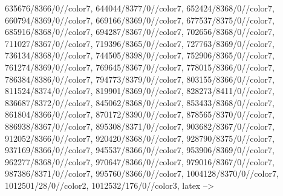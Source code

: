 {635676/8366/0//color7,
644044/8377/0//color7,
652424/8368/0//color7,
660794/8369/0//color7,
669166/8369/0//color7,
677537/8375/0//color7,
685916/8368/0//color7,
694287/8367/0//color7,
702656/8368/0//color7,
711027/8367/0//color7,
719396/8365/0//color7,
727763/8369/0//color7,
736134/8368/0//color7,
744505/8398/0//color7,
752906/8365/0//color7,
761274/8369/0//color7,
769645/8367/0//color7,
778015/8366/0//color7,
786384/8386/0//color7,
794773/8379/0//color7,
803155/8366/0//color7,
811524/8374/0//color7,
819901/8369/0//color7,
828273/8411/0//color7,
836687/8372/0//color7,
845062/8368/0//color7,
853433/8368/0//color7,
861804/8366/0//color7,
870172/8390/0//color7,
878565/8370/0//color7,
886938/8367/0//color7,
895308/8371/0//color7,
903682/8367/0//color7,
912052/8366/0//color7,
920420/8368/0//color7,
928790/8375/0//color7,
937169/8366/0//color7,
945537/8366/0//color7,
953906/8369/0//color7,
962277/8368/0//color7,
970647/8366/0//color7,
979016/8367/0//color7,
987386/8371/0//color7,
995760/8366/0//color7,
1004128/8370/0//color7,
1012501/28/0//color2,
1012532/176/0//color3,
}
latex -->
